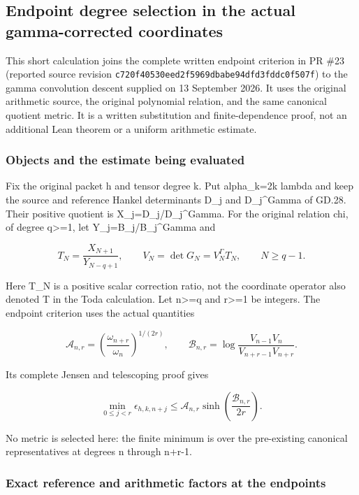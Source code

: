 \subsection{Endpoint degree selection in the actual gamma-corrected coordinates}\label{endpoint-eg_original--endpoint-degree-selection-in-the-actual-gamma-corrected-coordinates}

This short calculation joins the complete written endpoint criterion in PR \#23 (reported source revision \nolinkurl{c720f40530eed2f5969dbabe94dfd3fddc0f507f}) to the gamma convolution descent supplied on 13 September 2026. It uses the original arithmetic source, the original polynomial relation, and the same canonical quotient metric. It is a written substitution and finite-dependence proof, not an additional Lean theorem or a uniform arithmetic estimate.

\subsubsection{Objects and the estimate being evaluated}\label{endpoint-eg_original--objects-and-the-estimate-being-evaluated}

Fix the original packet h and tensor degree k. Put alpha\_k=2k lambda and keep the source and reference Hankel determinants D\_j and D\_j\^{}Gamma of GD.28. Their positive quotient is X\_j=D\_j/D\_j\^{}Gamma. For the original relation chi, of degree q\textgreater=1, let Y\_j=B\_j/B\_j\^{}Gamma and

\[
T_N=\frac{X_{N+1}}{Y_{N-q+1}},\qquad
V_N=\det G_N=V_N^\Gamma T_N,\qquad N\ge q-1.
\]

Here T\_N is a positive scalar correction ratio, not the coordinate operator also denoted T in the Toda calculation. Let n\textgreater=q and r\textgreater=1 be integers. The endpoint criterion uses the actual quantities

\[
\mathcal A_{n,r}=\left(\frac{\omega_{n+r}}{\omega_n}\right)^{1/(2r)},
\qquad
\mathcal B_{n,r}=\log\frac{V_{n-1}V_n}{V_{n+r-1}V_{n+r}}.
\]

Its complete Jensen and telescoping proof gives

\[
\min_{0\le j<r}\epsilon_{h,k,n+j}
\le \mathcal A_{n,r}\sinh\left(\frac{\mathcal B_{n,r}}{2r}\right).
\tag{EG.1}
\]

No metric is selected here: the finite minimum is over the pre-existing canonical representatives at degrees n through n+r-1.

\subsubsection{Exact reference and arithmetic factors at the endpoints}\label{endpoint-eg_original--exact-reference-and-arithmetic-factors-at-the-endpoints}

